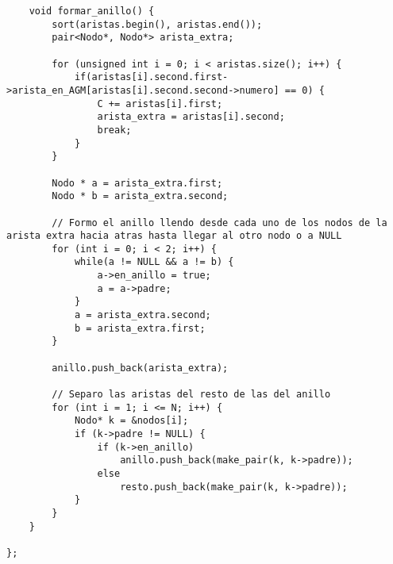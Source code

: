 \begin{frame}
\begin{lstlisting}
	void formar_anillo() {
        sort(aristas.begin(), aristas.end());
        pair<Nodo*, Nodo*> arista_extra;

        for (unsigned int i = 0; i < aristas.size(); i++) {
            if(aristas[i].second.first->arista_en_AGM[aristas[i].second.second->numero] == 0) {
                C += aristas[i].first;
                arista_extra = aristas[i].second;
                break;
            }
        }

        Nodo * a = arista_extra.first;
        Nodo * b = arista_extra.second;

        // Formo el anillo llendo desde cada uno de los nodos de la arista extra hacia atras hasta llegar al otro nodo o a NULL
        for (int i = 0; i < 2; i++) {        
            while(a != NULL && a != b) {
                a->en_anillo = true;
                a = a->padre;
            }
            a = arista_extra.second;
            b = arista_extra.first;
        }

        anillo.push_back(arista_extra);

        // Separo las aristas del resto de las del anillo
        for (int i = 1; i <= N; i++) {
            Nodo* k = &nodos[i];
            if (k->padre != NULL) {
                if (k->en_anillo)
                    anillo.push_back(make_pair(k, k->padre));
                else
                    resto.push_back(make_pair(k, k->padre));
            }
        }
    }

};

\end{lstlisting}
\end{frame}

